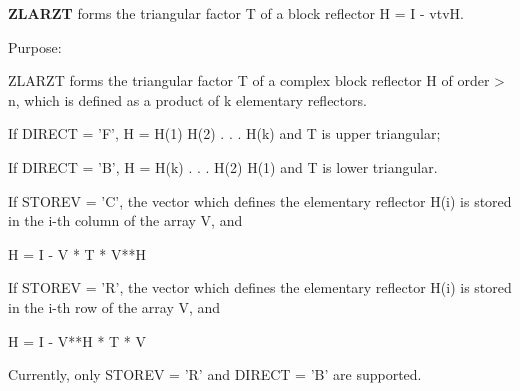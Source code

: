{\bfseries Z\+L\+A\+R\+Z\+T} forms the triangular factor T of a block reflector H = I -\/ vtv\+H. 

 \begin{DoxyParagraph}{Purpose\+: }
\begin{DoxyVerb} ZLARZT forms the triangular factor T of a complex block reflector
 H of order > n, which is defined as a product of k elementary
 reflectors.

 If DIRECT = 'F', H = H(1) H(2) . . . H(k) and T is upper triangular;

 If DIRECT = 'B', H = H(k) . . . H(2) H(1) and T is lower triangular.

 If STOREV = 'C', the vector which defines the elementary reflector
 H(i) is stored in the i-th column of the array V, and

    H  =  I - V * T * V**H

 If STOREV = 'R', the vector which defines the elementary reflector
 H(i) is stored in the i-th row of the array V, and

    H  =  I - V**H * T * V

 Currently, only STOREV = 'R' and DIRECT = 'B' are supported.\end{DoxyVerb}
 
\end{DoxyParagraph}

